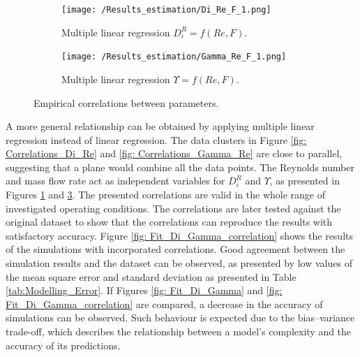 \documentclass[a4paper,fleqn]{cas-dc}
\begin{document}
				\begin{figure}[!h]
					\centering
					\begin{subfigure}{0.9\columnwidth}
						\centering
						\texttt{[image: /Results\_estimation/Di\_Re\_F\_1.png]}
						\caption{Multiple linear regression $D_i^R = f(Re, F)$.}
						\label{fig: Correlations_Di_Re_F}
					\end{subfigure}
					\hfill
					\begin{subfigure}{0.9\columnwidth}
						\centering
						\texttt{[image: /Results\_estimation/Gamma\_Re\_F\_1.png]}
						\caption{Multiple linear regression $\Upsilon = f(Re, F)$.}
						\label{fig: Correlations_Gamma_Re_F}
					\end{subfigure}
					\caption{Empirical correlations between parameters.}
				\end{figure}
				
				A more general relationship can be obtained by applying multiple linear regression instead of linear regression. The data clusters in Figure \ref{fig: Correlations_Di_Re} and \ref{fig: Correlations_Gamma_Re} are close to parallel, suggesting that a plane would combine all the data points. The Reynolds number and mass flow rate act as independent variables for $D_i^R$ and $\Upsilon$, as presented in Figures \ref{fig: Correlations_Di_Re_F} and \ref{fig: Correlations_Gamma_Re_F}. The presented correlations are valid in the whole range of investigated operating conditions. The correlations are later tested against the original dataset to show that the correlations can reproduce the results with satisfactory accuracy. Figure \ref{fig: Fit_Di_Gamma_correlation} shows the results of the simulations with incorporated correlations. Good agreement between the simulation results and the dataset can be observed, as presented by low values of the mean square error and standard deviation as presented in Table \ref{tab:Modelling_Error}. If Figures \ref{fig: Fit_Di_Gamma} and \ref{fig: Fit_Di_Gamma_correlation} are compared, a decrease in the accuracy of simulations can be observed. Such behaviour is expected due to the bias--variance trade-off, which describes the relationship between a model's complexity and the accuracy of its predictions.
				
\end{document}
